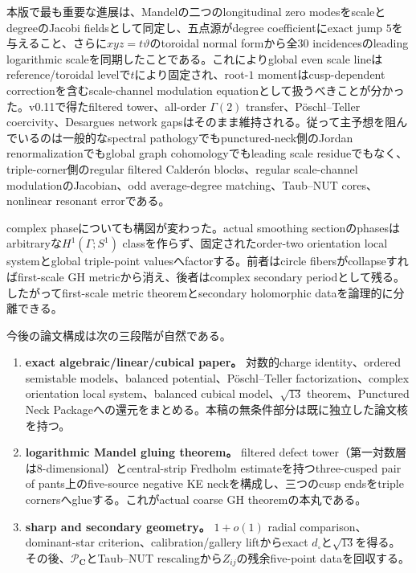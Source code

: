 \documentclass[11pt,a4paper]{ltjsarticle}
\theoremstyle{definition}
\theoremstyle{remark}
\newcommand{\CC}{\mathbf C}
\begin{document}
本版で最も重要な進展は、Mandelの二つのlongitudinal zero modesをscaleとdegreeのJacobi fieldsとして同定し、五点源がdegree coefficientにexact jump $5$を与えること、さらに$xyz=t\vartheta$のtoroidal normal formから全30 incidencesのleading logarithmic scaleを同期したことである。これによりglobal even scale lineはreference/toroidal levelで$t$により固定され、root-$1$ momentはcusp-dependent correctionを含むscale-channel modulation equationとして扱うべきことが分かった。v0.11で得たfiltered tower、all-order $\Gamma(2)$ transfer、Pöschl--Teller coercivity、Desargues network gapsはそのまま維持される。従って主予想を阻んでいるのは一般的なspectral pathologyでもpunctured-neck側のJordan renormalizationでもglobal graph cohomologyでもleading scale residueでもなく、triple-corner側のregular filtered Calder\'on blocks、regular scale-channel modulationのJacobian、odd average-degree matching、Taub--NUT cores、nonlinear resonant errorである。

complex phaseについても構図が変わった。actual smoothing sectionのphasesはarbitraryな$H^1(\Gamma;S^1)$ classを作らず、固定されたorder-two orientation local systemとglobal triple-point valuesへfactorする。前者はcircle fibersがcollapseすればfirst-scale GH metricから消え、後者はcomplex secondary periodとして残る。したがってfirst-scale metric theoremとsecondary holomorphic dataを論理的に分離できる。

今後の論文構成は次の三段階が自然である。
\begin{enumerate}[label=(\roman*),leftmargin=3em]
\item \textbf{exact algebraic/linear/cubical paper。}
対数的charge identity、ordered semistable models、balanced potential、Pöschl--Teller factorization、complex orientation local system、balanced cubical model、$\sqrt{13}$ theorem、Punctured Neck Packageへの還元をまとめる。本稿の無条件部分は既に独立した論文核を持つ。
\item \textbf{logarithmic Mandel gluing theorem。}
filtered defect tower（第一対数層は8-dimensional）とcentral-strip Fredholm estimateを持つthree-cusped pair of pants上のfive-source negative KE neckを構成し、三つのcusp endsをtriple cornersへglueする。これがactual coarse GH theoremの本丸である。
\item \textbf{sharp and secondary geometry。}
$1+o(1)$ radial comparison、dominant-star criterion、calibration/gallery liftからexact $d_\square$と$\sqrt{13}$を得る。その後、$\mathcal P_{\CC}$とTaub--NUT rescalingから$Z_{ij}$の残余five-point dataを回収する。
\end{enumerate}
\end{document}
